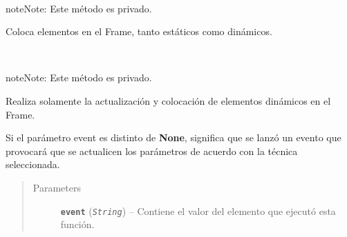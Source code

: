 \documentclass[letterpaper,10pt,english]{sphinxmanual}
\begin{document}
\begin{fulllineitems}
\begin{fulllineitems}
\end{fulllineitems}


\begin{fulllineitems}
\label{View/Main/MOEA/AlgorithmFrame:View.Main.MOEA.AlgorithmFrame.AlgorithmFrame._AlgorithmFrame__grid_widgets}~
\begin{notice}{note}{Note:}
Este método es privado.
\end{notice}

Coloca elementos en el Frame, tanto estáticos como dinámicos.

\end{fulllineitems}


\begin{fulllineitems}
\label{View/Main/MOEA/AlgorithmFrame:View.Main.MOEA.AlgorithmFrame.AlgorithmFrame._AlgorithmFrame__update_widgets}~
\begin{notice}{note}{Note:}
Este método es privado.
\end{notice}

\begin{DUlineblock}{0em}
\item[] Realiza solamente la actualización y colocación de elementos dinámicos 
en el Frame.
\item[] Si el parámetro event es distinto de \textbf{None}, significa que se lanzó 
un evento que provocará que se actualicen los parámetros de acuerdo con
la técnica seleccionada.
\end{DUlineblock}
\begin{quote}\begin{description}
\item[{Parameters}] \leavevmode
\textbf{\texttt{event}} (\emph{\texttt{String}}) -- Contiene el valor del elemento que ejecutó esta función.

\end{description}\end{quote}

\end{fulllineitems}



\end{fulllineitems}
\end{document}
